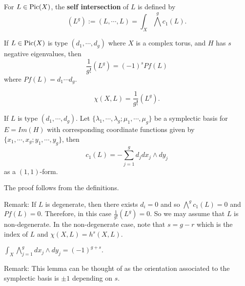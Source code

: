 \begin{definition}
For $L\in \operatorname{Pic}(X)$, the \textbf{self intersection} of $L$ is defined by 
$$(L^g):=(L,\cdots, L)=\int_X \bigwedge^g c_1(L).$$
\end{definition}

\begin{theorem}
If $L\in \operatorname{Pic}(X)$ is type $(d_1,\cdots,d_g)$ where $X$ is a complex torus, and $H$ has $s$ negative eigenvalues, then
$$\frac{1}{g!}(L^g)=(-1)^s Pf(L)$$
where $Pf(L)=d_1\cdots d_g$. 
\end{theorem}

\begin{corollary}
$$\chi(X,L)=\frac{1}{g!}(L^g).$$
\end{corollary}

\begin{lemma}
If $L$ is type $(d_1,\cdots,d_g)$. Let $\{\lambda_1,\cdots,\lambda_g; \mu_1,\cdots,\mu_g\}$ be a symplectic basis for $E=Im(H)$ with corresponding coordinate functions given by $\{x_1,\cdots, x_g; y_1,\cdots, y_g\}$, then 
$$c_1(L)=-\sum_{j=1}^g d_j dx_j\wedge dy_j$$
as a $(1,1)$-form.
\end{lemma}

The proof follows from the definitions.

Remark: If $L$ is degenerate, then there exists $d_i=0$ and so $\bigwedge^g c_1(L)=0$ and $Pf(L)=0$. Therefore, in this case $\frac{1}{g!}(L^g)=0$. So we may assume that $L$ is non-degenerate. In the non-degenerate case, note that $s=g-r$ which is the index of $L$ and $\chi(X,L)=h^s(X,L)$. 

\begin{lemma}
$\int_X \bigwedge_{j=1}^g dx_j\wedge dy_j=(-1)^{g+s}.$
\end{lemma}

Remark: This lemma can be thought of as the orientation associated to the symplectic basis is $\pm 1$ depending on $s$.

